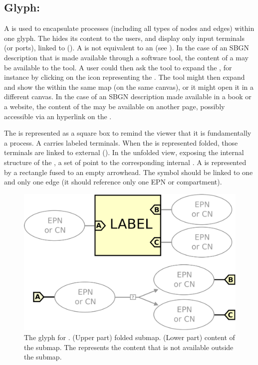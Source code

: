 \subsection{Glyph: }
\label{sec:submap}

A  is used to encapsulate processes (including all types of nodes and edges) within one glyph.  The  hides its content to the users, and display only input terminals (or ports), linked to  (). A  is not equivalent to an  (see ).  
In the case of an SBGN description that is made available through a software tool, the content of a  may be available to the tool.  A user could then ask the tool to expand the , for instance by clicking on the icon representing the .  The tool might then expand and show the  within the same map (on the same canvas), or it might open it in a different canvas. In the case of an SBGN description made available in a book or a website, the content of the  may be available on another page, possibly accessible via an hyperlink on the . 

The  is represented as a square box to remind the viewer that it is fundamentally a process. A  carries labeled terminals.  When the  is represented folded, those terminals are linked to external  ().  In the unfolded view, exposing the internal structure of the , a set of  point to the corresponding internal  . A  is represented by a rectangle fused to an empty arrowhead. The symbol should be linked to one and only one edge (\ie it should reference only one EPN or compartment).

\begin{figure}[H]
  \centering
  \includegraphics[scale = 0.22]{images/submap}
  \caption{The \PD glyph for . (Upper part) folded submap. (Lower part) content of the submap. The  represents the content that is not available outside the submap.}
  \label{fig:submap}
\end{figure}

